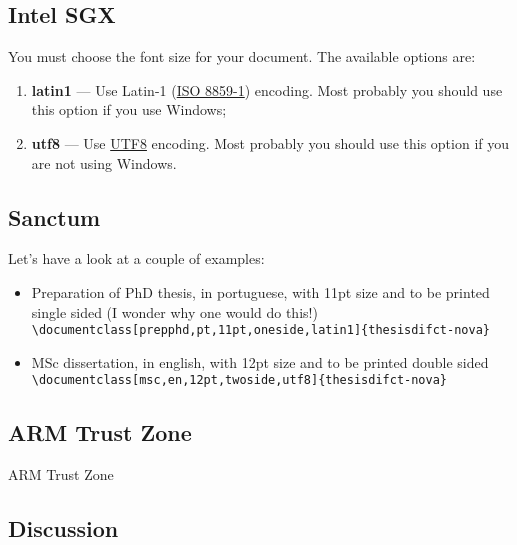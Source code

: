 \subsection{Intel SGX} %
\label{ssec:Intel_sgx}

You must choose the font size for your document. The available options are:
\begin{enumerate}
	\item \textbf{latin1} --- Use Latin-1 (\href{http://en.wikipedia.org/wiki/ISO/IEC_8859-1}{ISO 8859-1}) encoding.  Most probably you should use this option if you use Windows;
	\item \textbf{utf8} --- Use \href{http://en.wikipedia.org/wiki/UTF-8}{UTF8} encoding.    Most probably you should use this option if you are not using Windows.
\end{enumerate}

\subsection{Sanctum} %
\label{ssec:sanctum}

Let's have a look at a couple of examples:

\begin{itemize}
	\item Preparation of PhD thesis, in portuguese, with 11pt size and to be printed single sided (I wonder why one would do this!)\\
	\verb!\documentclass[prepphd,pt,11pt,oneside,latin1]{thesisdifct-nova}!
	\item MSc dissertation, in english, with 12pt size and to be printed double sided\\
	\verb!\documentclass[msc,en,12pt,twoside,utf8]{thesisdifct-nova}!
\end{itemize}

\subsection{ARM Trust Zone} %
\label{ssec:arm_trust_zone}

ARM Trust Zone

\subsection{Discussion}
\label{ssec:s2_discussion}

